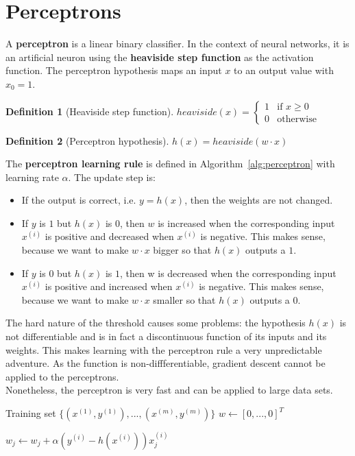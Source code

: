 \documentclass{report}
\newtheorem{definition}{Definition}[section]
\begin{document}
\section{Perceptrons}
A {\bf perceptron} is a linear binary classifier. In the context of neural networks, it is an artificial neuron using the {\bf heaviside step function} as the activation function.
The perceptron hypothesis maps an input $x$ to an output value with $x_0=1$.

\begin{definition}[Heaviside step function]
$heaviside(x) = \left\{
\begin{array}{lll}
1  & \mbox{if } x \ge 0 \\
0  & \mbox{otherwise}
\end{array}
\right.$
\end{definition}

\begin{definition}[Perceptron hypothesis]
$h(x) = heaviside(w\cdot x)$
\end{definition}


The {\bf perceptron learning rule} is defined in Algorithm~\ref{alg:perceptron} with learning rate $\alpha$. The update step is:
\begin{itemize}
\item If the output is correct, i.e. $y = h(x)$, then the weights are not changed.
\item If $y$ is $1$ but $h(x)$ is $0$, then $w$ is increased when the corresponding input $x^{(i)}$ is positive and decreased when $x^{(i)}$ is negative. This makes sense, because we want to make $w\cdot x$ bigger so that $h(x)$ outputs a $1$.
\item If $y$ is 0 but $h(x)$ is $1$, then w is decreased when the corresponding input $x^{(i)}$ is positive and increased when $x^{(i)}$ is negative. This makes sense, because we want to make $w\cdot x$ smaller so that $h(x)$ outputs a $0$.
\end{itemize}

The hard nature of the threshold causes some problems: the hypothesis $h(x)$ is not differentiable and is in fact a discontinuous function of its inputs and its weights. This makes learning with the perceptron rule a very unpredictable adventure. 
As the function is non-diffferentiable, gradient descent cannot be applied to the perceptrons. \\
Nonetheless, the perceptron is very fast and can be applied to large data sets.

\begin{algorithm}[h!]
\caption{Perceptron learning rule}
\label{alg:perceptron}
\begin{algorithmic}
\State Training set $\{(x^{(1)},y^{(1)}),...,(x^{(m)},y^{(m)})\}$
\State $w \gets [0,...,0]^T$ 

\State $w_j \gets w_j + \alpha(y^{(i)} - h(x^{(i)})) x^{(i)}_j$ 
\EndFor

\end{algorithmic}
\end{algorithm}
\end{document}
